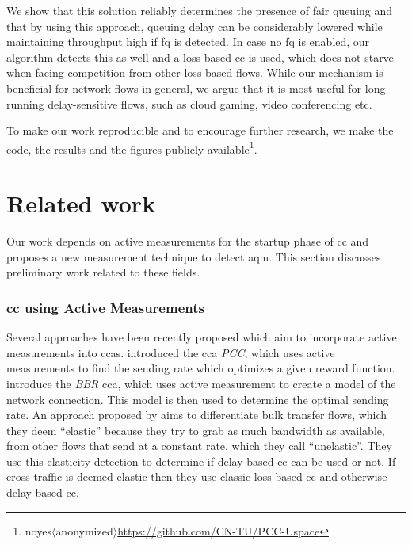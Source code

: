 \documentclass[conference]{IEEEtran}
\def\anonymize{no}
\def\tempYes{yes}
\begin{document}
We show that this solution reliably determines the presence of fair queuing and that by using this approach, queuing delay can be considerably lowered while maintaining throughput high if \gls{fq} is detected. In case no \gls{fq} is enabled, our algorithm detects this as well and a loss-based \gls{cc} is used, which does not starve when facing competition from other loss-based flows. 
While our mechanism is beneficial for network flows in general, we argue that it is most useful for long-running delay-sensitive flows, such as cloud gaming, video conferencing etc. 

To make our work reproducible and to encourage further research, we make the code, the results and the figures publicly available\footnote{\ifx\anonymize\tempYes $\langle$anonymized$\rangle$\else\url{https://github.com/CN-TU/PCC-Uspace}\fi}. 

\section{Related work}
Our work depends on active measurements for the startup phase of \gls{cc} and proposes a new measurement technique to detect \gls{aqm}. This section discusses preliminary work related to these fields. 

\subsubsection{\gls{cc} using Active Measurements}
Several approaches have been recently proposed which aim to incorporate active measurements into \glspl{cca}. \citep{dong_pcc_2015,dong_pcc_2018} introduced the \gls{cca} \textit{PCC}, which uses active measurements to find the sending rate which optimizes a given reward function. \citep{cardwell_bbr:_2016} introduce the \textit{BBR} \gls{cca}, which uses active measurement to create a model of the network connection. This model is then used to determine the optimal sending rate. An approach proposed by \citep{goyal_elasticity_2018} aims to differentiate bulk transfer flows, which they deem ``elastic'' because they try to grab as much bandwidth as available, from other flows that send at a constant rate, which they call ``unelastic''. They use this elasticity detection to determine if delay-based \gls{cc} can be used or not. If cross traffic is deemed elastic then they use classic loss-based \gls{cc} and otherwise delay-based \gls{cc}. 
\end{document}

